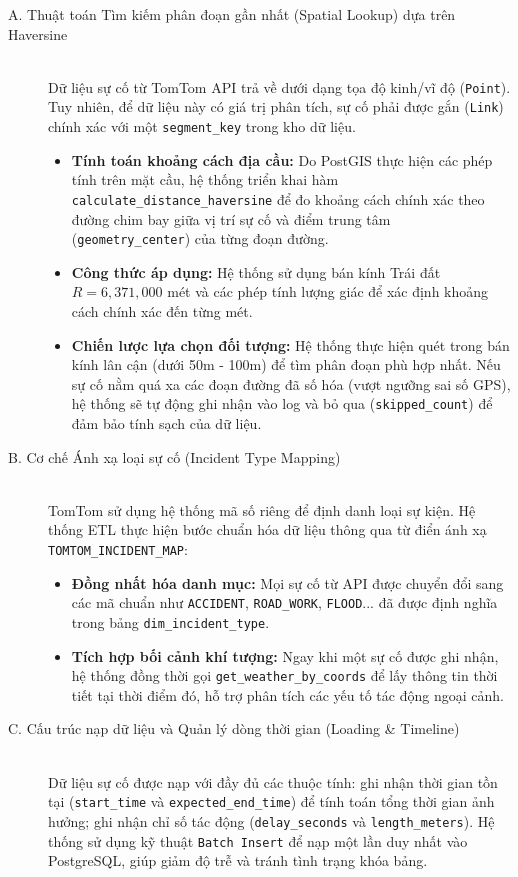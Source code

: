 \begin{description}
    \item[A. Thuật toán Tìm kiếm phân đoạn gần nhất (Spatial Lookup) dựa trên Haversine] \hfill \\
    Dữ liệu sự cố từ TomTom API trả về dưới dạng tọa độ kinh/vĩ độ (\texttt{Point}). Tuy nhiên, để dữ liệu này có giá trị phân tích, sự cố phải được gắn (\texttt{Link}) chính xác với một \texttt{segment\_key} trong kho dữ liệu.
    \begin{itemize}
        \item \textbf{Tính toán khoảng cách địa cầu:} Do PostGIS thực hiện các phép tính trên mặt cầu, hệ thống triển khai hàm \texttt{calculate\_distance\_haversine} để đo khoảng cách chính xác theo đường chim bay giữa vị trí sự cố và điểm trung tâm (\texttt{geometry\_center}) của từng đoạn đường.
        \item \textbf{Công thức áp dụng:} Hệ thống sử dụng bán kính Trái đất $R = 6,371,000$ mét và các phép tính lượng giác để xác định khoảng cách chính xác đến từng mét.
        \item \textbf{Chiến lược lựa chọn đối tượng:} Hệ thống thực hiện quét trong bán kính lân cận (dưới 50m - 100m) để tìm phân đoạn phù hợp nhất. Nếu sự cố nằm quá xa các đoạn đường đã số hóa (vượt ngưỡng sai số GPS), hệ thống sẽ tự động ghi nhận vào log và bỏ qua (\texttt{skipped\_count}) để đảm bảo tính sạch của dữ liệu.
    \end{itemize}

    \item[B. Cơ chế Ánh xạ loại sự cố (Incident Type Mapping)] \hfill \\
    TomTom sử dụng hệ thống mã số riêng để định danh loại sự kiện. Hệ thống ETL thực hiện bước chuẩn hóa dữ liệu thông qua từ điển ánh xạ \texttt{TOMTOM\_INCIDENT\_MAP}:
    \begin{itemize}
        \item \textbf{Đồng nhất hóa danh mục:} Mọi sự cố từ API được chuyển đổi sang các mã chuẩn như \texttt{ACCIDENT}, \texttt{ROAD\_WORK}, \texttt{FLOOD}... đã được định nghĩa trong bảng \texttt{dim\_incident\_type}.
        \item \textbf{Tích hợp bối cảnh khí tượng:} Ngay khi một sự cố được ghi nhận, hệ thống đồng thời gọi \texttt{get\_weather\_by\_coords} để lấy thông tin thời tiết tại thời điểm đó, hỗ trợ phân tích các yếu tố tác động ngoại cảnh.
    \end{itemize}

    \item[C. Cấu trúc nạp dữ liệu và Quản lý dòng thời gian (Loading \& Timeline)] \hfill \\
    Dữ liệu sự cố được nạp với đầy đủ các thuộc tính: ghi nhận thời gian tồn tại (\texttt{start\_time} và \texttt{expected\_end\_time}) để tính toán tổng thời gian ảnh hưởng; ghi nhận chỉ số tác động (\texttt{delay\_seconds} và \texttt{length\_meters}). Hệ thống sử dụng kỹ thuật \texttt{Batch Insert} để nạp một lần duy nhất vào PostgreSQL, giúp giảm độ trễ và tránh tình trạng khóa bảng.
\end{description}

